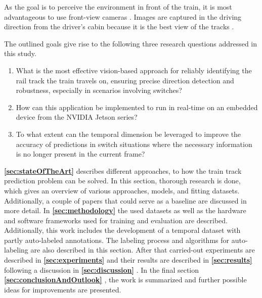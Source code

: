 As the goal is to perceive the environment in front of the train, it is most advantageous to use front-view cameras \cite{tepNet2024} \cite{railNet2019}.
Images are captured in the driving direction from the driver's cabin because it is the best view of the tracks \cite{tepNet2024}.

\vspace{1cm} %

The outlined goals give rise to the following three research questions addressed in this study.

\begin{enumerate}
    \item What is the most effective vision-based approach for reliably identifying the rail track the train travels on, ensuring precise direction detection and robustness, especially in scenarios involving switches?
    \item How can this application be implemented to run in real-time on an embedded device from the NVIDIA Jetson series?
    \item To what extent can the temporal dimension be leveraged to improve the accuracy of predictions in switch situations where the necessary information is no longer present in the current frame?
\end{enumerate}

\vspace{2cm} %

\textbf{\ref{sec:stateOfTheArt}} \textbf{} describes different approaches, to how the train track prediction problem can be solved.
In this section, thorough research is done, which gives an overview of various approaches, models, and fitting datasets.
Additionally, a couple of papers that could serve as a baseline are discussed in more detail.
In \textbf{\ref{sec:methodology}} \textbf{} the used datasets as well as the hardware and software frameworks used for training and evaluation are described.
Additionally, this work includes the development of a temporal dataset with partly auto-labeled annotations.
The labeling process and algorithms for auto-labeling are also described in this section.
After that carried-out experiments are described in \textbf{\ref{sec:experiments}} \textbf{} and their results are described in \textbf{\ref{sec:results}} \textbf{} following a discussion in \textbf{\ref{sec:discussion}} \textbf{}.
In the final section \textbf{\ref{sec:conclusionAndOutlook}} \textbf{}, the work is summarized and further possible ideas for improvements are presented.



